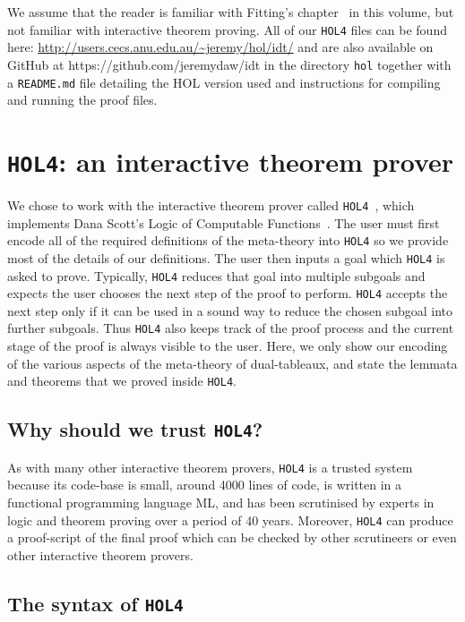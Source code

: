 \documentclass[a4paper]{article}
\newcommand{\hol}{\texttt{HOL4}}
\begin{document}
We assume that the reader is familiar with Fitting's
chapter~\cite{fitting-dual-tableau} in this volume, but not familiar
with interactive theorem proving. All of our \hol{} files can be found
here:
\url{http://users.cecs.anu.edu.au/~jeremy/hol/idt/}
and are also available on GitHub at 
https://github.com/jeremydaw/idt in the directory \texttt{hol}
together with a \texttt{README.md} file detailing the HOL version used
and instructions for compiling and running the proof files.

\section{\hol: an interactive theorem prover}

We chose to work with the interactive theorem prover called
\hol~\cite{DBLP:conf/tphol/Gordon08}, which implements Dana Scott's
Logic of Computable Functions~\cite{scott-computable}. The user must
first encode all of the required definitions of the meta-theory into
\hol{} so we provide most of the details of our definitions. The user
then inputs a goal which \hol{} is asked to prove. Typically, \hol{}
reduces that goal into multiple subgoals and expects the user chooses
the next step of the proof to perform. \hol{} accepts the next step
only if it can be used in a sound way to reduce the chosen subgoal
into further subgoals. Thus \hol{} also keeps track of the proof
process and the current stage of the proof is always visible to the
user. Here, we only show our encoding of the various aspects of the
meta-theory of dual-tableaux, and state the lemmata and theorems that
we proved inside \hol.

\subsection{Why should we trust \hol?}

As with many other interactive theorem provers, \hol{} is a trusted
system because its code-base is small, around 4000 lines of
code, is written in a functional programming language ML, and has
been scrutinised by experts in logic and theorem proving over a period
of 40 years. Moreover, \hol{} can produce a proof-script of the final
proof which can be checked by other scrutineers or even other
interactive theorem provers.

\subsection{The syntax of \hol}
\end{document}
